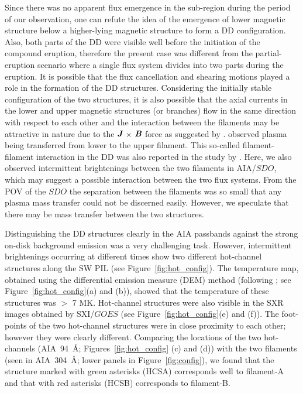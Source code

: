 \documentclass{aastex62}
\begin{document}
Since there was no apparent flux emergence in the sub-region during the period of our observation, one can refute the idea of the emergence of lower magnetic structure below a higher-lying magnetic structure to form a DD configuration. Also, both parts of the DD were visible well before the initiation of the compound eruption, therefore the present case was different from the partial-eruption scenario where a single flux system divides into two parts during the eruption. It is possible that the flux cancellation and shearing motions played a role in the formation of the DD structures. Considering the initially stable configuration of the two structures, it is also possible that the axial currents in the lower and upper magnetic structures (or branches) flow in the same direction with respect to each other and the interaction between the filaments may be attractive in nature due to the $\textit{\textbf{J}}$ $\times$ $\textit{\textbf{B}}$ force as suggested by \citet{Kliem_etal_2014}. \citet{Liu_etal_2012} observed plasma being transferred from lower to the upper filament. This so-called filament-filament interaction in the DD was also reported in the study by \citet{Zhu_etal_2015}. Here, we also observed intermittent brightenings between the two filaments in AIA/$\textit{SDO}$, which may suggest a possible interaction between the two flux systems. From the POV of the $\textit{SDO}$ the separation between the filaments was so small that any plasma mass transfer could not be discerned easily. However, we speculate that there may be mass transfer between the two structures. 


Distinguishing the DD structures clearly in the AIA passbands against the strong on-disk background emission was a very challenging task. However, intermittent brightenings occurring at different times show two different hot-channel structures along the SW PIL (see Figure~\ref{fig:hot_config}). The temperature map, obtained using the differential emission measure (DEM) method (following \citealt{Cheng_etal_2012}; see Figure~\ref{fig:hot_config}(a) and (b)), showed that the temperature of these structures was $>$ 7 MK. Hot-channel structures were also visible in the SXR images obtained by SXI/$\textit{GOES}$ (see Figure~\ref{fig:hot_config}(e) and (f)). The foot-points of the two hot-channel structures were in close proximity to each other; however they were clearly different. Comparing the locations of the two hot-channels (AIA~94~\AA; Figures~\ref{fig:hot_config} (c) and (d)) with the two filaments (seen in AIA~304~\AA; lower panels in Figure~\ref{fig:config}), we found that the structure  marked with green asterisks (HCSA) corresponds well to filament-A and that with red asterisks (HCSB) corresponds to filament-B.
\end{document}
